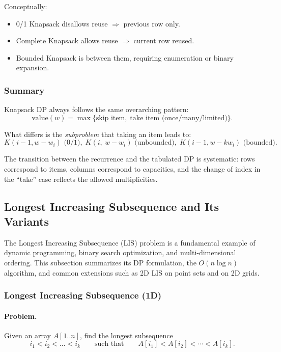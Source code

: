 \documentclass[9pt]{extarticle}
\begin{document}
Conceptually:
\begin{itemize}
    \item 0/1 Knapsack disallows reuse $\Rightarrow$ previous row only.
    \item Complete Knapsack allows reuse $\Rightarrow$ current row reused.
    \item Bounded Knapsack is between them, requiring enumeration or binary expansion.
\end{itemize}

\subsubsection{Summary}

Knapsack DP always follows the same overarching pattern:
\[
\text{value}(w) = \max \{\text{skip item},\;\text{take item (once/many/limited)}\}.
\]

What differs is the \emph{subproblem} that taking an item leads to:
\[
K(i-1,w-w_i) \text{ (0/1)},\;
K(i,\ w-w_i) \text{ (unbounded)},\;
K(i-1,w-k w_i) \text{ (bounded)}.
\]

The transition between the recurrence and the tabulated DP is systematic:
rows correspond to items, columns correspond to capacities, and 
the change of index in the “take” case reflects the allowed multiplicities.

\subsection{Longest Increasing Subsequence and Its Variants}

The Longest Increasing Subsequence (LIS) problem is a fundamental example of
dynamic programming, binary search optimization, and multi-dimensional ordering.
This subsection summarizes its DP formulation, the $O(n\log n)$ algorithm, and
common extensions such as 2D LIS on point sets and on 2D grids.

\subsubsection{Longest Increasing Subsequence (1D)}

\paragraph{Problem.}
Given an array $A[1..n]$, find the longest subsequence
\[
i_1 < i_2 < \dots < i_k
\qquad\text{such that}\qquad
A[i_1] < A[i_2] < \cdots < A[i_k].
\]
\end{document}

